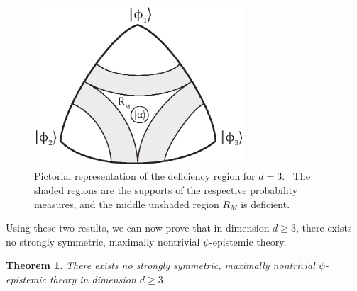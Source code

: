 \documentclass[letterpaper,12pt]{article}
\newtheorem{thm}{Theorem}
\begin{document}
\begin{figure}[h]
\centering \includegraphics[height=6cm]{figdeficiency2.eps} \vspace{-20pt}
\caption{Pictorial representation of the deficiency region for $d=3$. \ The
shaded regions are the supports of the respective probability measures,
and the middle unshaded region $R_M$ is deficient.} \label{figdeficiency}
\end{figure}

Using these two results, we can now prove that in dimension $d\geq 3$, there exists no strongly symmetric, maximally nontrivial $\psi$-epistemic theory.


\begin{thm}
\label{strong-symmetry-thm}
There exists no strongly symmetric, maximally nontrivial $\psi$-epistemic theory in
dimension $d\geq 3$.
\end{thm}
\end{document}
